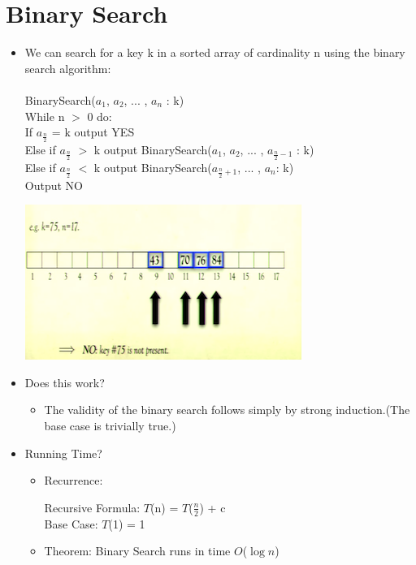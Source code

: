 \documentclass[12pt]{article}
\begin{document}
\section{Binary Search}
\renewcommand{\labelitemii}{$\circ$}
\renewcommand{\labelitemiii}{$\cdot$}
\renewcommand{\labelitemiii}{$\rightarrow$}
\renewcommand{\labelitemiv}{$\star$}
\begin{itemize}
\item We can search for a key k in a sorted array of cardinality n using the binary search algorithm:\\
\\
{\large
\noindent BinarySearch($a_1$, $a_2$, ... , $a_n$ : k)\\
\noindent While n $>$ 0 do: \\
		 If $a_{\frac{n}{2}}$ = k output YES\\
		 Else if $a_{\frac{n}{2}}$ $>$ k output BinarySearch($a_1$, $a_2$, ... , $a_{\frac{n}{2} - 			1}$ : k)\\
		Else if $a_{\frac{n}{2}}$ $<$ k output BinarySearch($a_{\frac{n}{2} + 1}$, ... , $a_n$: k)\\
		Output NO}
\begin{center}
\includegraphics{lecture2d}
\end{center}
\item Does this work?
	\begin{itemize}
	\item The validity of the binary search follows simply by strong induction.(The base case is 		trivially true.)
	\end{itemize}
\item Running Time?
	\begin{itemize}
	\item Recurrence: 
	\begin{center}
	\large{Recursive Formula: $T$(n) = $T$($\frac{n}{2}$) + c} \\
	\large{Base Case: $T$(1) = 1}
	\end{center}
	\item Theorem: Binary Search runs in time $O$($\log{}n$)

\end{itemize}
\end{itemize}
\end{document}
